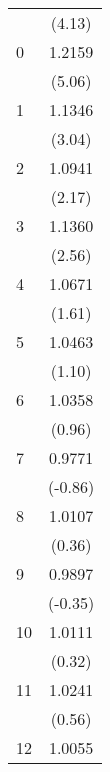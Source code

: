 {\begin{tabular}{l*{1}{c}}
                                   &      (4.13)         \\
[1em]
    0                              &      1.2159\sym{***}\\
                                   &      (5.06)         \\
[1em]
    1                              &      1.1346\sym{***}\\
                                   &      (3.04)         \\
[1em]
    2                              &      1.0941\sym{**} \\
                                   &      (2.17)         \\
[1em]
    3                              &      1.1360\sym{**} \\
                                   &      (2.56)         \\
[1em]
    4                              &      1.0671         \\
                                   &      (1.61)         \\
[1em]
    5                              &      1.0463         \\
                                   &      (1.10)         \\
[1em]
    6                              &      1.0358         \\
                                   &      (0.96)         \\
[1em]
    7                              &      0.9771         \\
                                   &     (-0.86)         \\
[1em]
    8                              &      1.0107         \\
                                   &      (0.36)         \\
[1em]
    9                              &      0.9897         \\
                                   &     (-0.35)         \\
[1em]
   10                              &      1.0111         \\
                                   &      (0.32)         \\
[1em]
   11                              &      1.0241         \\
                                   &      (0.56)         \\
[1em]
   12                              &      1.0055         \\

\end{tabular}}
